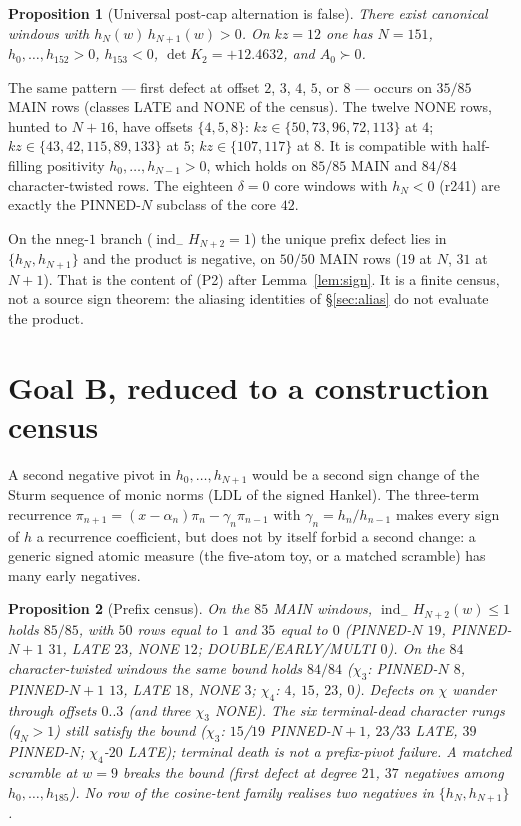 \documentclass[11pt]{article}
\newtheorem{prop}{Proposition}
\theoremstyle{remark}
\newcommand{\indm}{\operatorname{ind}_{-}}
\begin{document}
\begin{prop}[Universal post-cap alternation is false]\label{prop:A-refute}
There exist canonical windows with $h_N(w)\,h_{N+1}(w)>0$.
On $kz=12$ one has $N=151$, $h_0,\ldots,h_{152}>0$,
$h_{153}<0$, $\det K_2=+12.4632$, and $A_0\succ 0$.
\end{prop}

The same pattern --- first defect at offset $2$, $3$, $4$, $5$,
or $8$ --- occurs on $35/85$ MAIN rows (classes LATE and NONE of
the census).  The twelve NONE rows, hunted to $N+16$, have
offsets $\{4,5,8\}$:
$kz\in\{50,73,96,72,113\}$ at $4$;
$kz\in\{43,42,115,89,133\}$ at $5$;
$kz\in\{107,117\}$ at $8$.
It is compatible with half-filling positivity
$h_0,\ldots,h_{N-1}>0$, which holds on $85/85$ MAIN and $84/84$
character-twisted rows.  The eighteen $\delta=0$ core windows
with $h_N<0$ (r241) are exactly the PINNED-$N$ subclass of the
core $42$.

On the nneg-$1$ branch ($\indm H_{N+2}=1$) the unique prefix
defect lies in $\{h_N,h_{N+1}\}$ and the product is negative, on
$50/50$ MAIN rows ($19$ at $N$, $31$ at $N+1$).  That is the
content of (P2) after Lemma~\ref{lem:sign}.  It is a finite
census, not a source sign theorem: the aliasing identities of
\S\ref{sec:alias} do not evaluate the product.

\section{Goal B, reduced to a construction census}\label{sec:B}

A second negative pivot in $h_0,\ldots,h_{N+1}$ would be a second
sign change of the Sturm sequence of monic norms (LDL of the
signed Hankel).  The three-term recurrence
$\pi_{n+1}=(x-\alpha_n)\pi_n-\gamma_n\pi_{n-1}$ with
$\gamma_n=h_n/h_{n-1}$ makes every sign of $h$ a recurrence
coefficient, but does not by itself forbid a second change: a
generic signed atomic measure (the five-atom toy, or a matched
scramble) has many early negatives.

\begin{prop}[Prefix census]\label{prop:census}
On the $85$ MAIN windows, $\indm H_{N+2}(w)\le 1$ holds $85/85$,
with $50$ rows equal to $1$ and $35$ equal to $0$
(PINNED-$N$ $19$, PINNED-$N{+}1$ $31$, LATE $23$, NONE $12$;
DOUBLE/EARLY/MULTI $0$).  On the $84$ character-twisted windows
the same bound holds $84/84$ ($\chi_3$: PINNED-$N$ $8$,
PINNED-$N{+}1$ $13$, LATE $18$, NONE $3$; $\chi_4$: $4$, $15$,
$23$, $0$).  Defects on $\chi$ wander through offsets $0..3$
(and three $\chi_3$ NONE).  The six terminal-dead character
rungs ($q_N>1$) still satisfy the bound
($\chi_3$: $15$/$19$ PINNED-$N{+}1$, $23$/$33$ LATE, $39$ PINNED-$N$;
$\chi_4$-$20$ LATE); terminal death is not a prefix-pivot failure.
A matched scramble at $w=9$ breaks the bound (first defect at
degree $21$, $37$ negatives among $h_0,\ldots,h_{185}$).
No row of the cosine-tent family realises two negatives in
$\{h_N,h_{N+1}\}$.
\end{prop}
\end{document}
